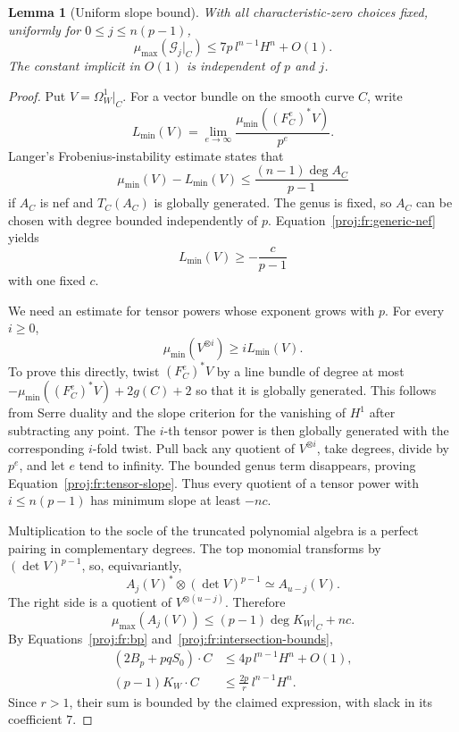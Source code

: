 \documentclass[11pt,letterpaper]{article}
\newtheorem{lemma}[theorem]{Lemma}
\theoremstyle{definition}
\theoremstyle{remark}
\begin{document}
\begin{lemma}[Uniform slope bound]
\label{proj:fr:slope}
With all characteristic-zero choices fixed, uniformly for
\(0\leq j\leq n(p-1)\),
\[
 \mu_{\max}(\mathcal G_j|_C)
     \leq 7p\,l^{n-1}H^n+O(1).
\]
The constant implicit in \(O(1)\) is independent of \(p\) and \(j\).
\end{lemma}

\begin{proof}
Put \(V=\Omega_W^1|_C\). For a vector bundle on the smooth curve \(C\),
write
\[
 L_{\min}(V)=
 \lim_{e\to\infty}
 \frac{\mu_{\min}((F_C^e)^*V)}{p^e}.
\]
Langer's Frobenius-instability estimate
\cite[Corollary~2.5]{Proj-Langer2004} states that
\[
 \mu_{\min}(V)-L_{\min}(V)
       \leq \frac{(n-1)\deg A_C}{p-1}
\]
if \(A_C\) is nef and \(T_C(A_C)\) is globally generated.
The genus is fixed, so \(A_C\) can be chosen with degree bounded
independently of \(p\). Equation~\eqref{proj:fr:generic-nef} yields
\begin{equation}
\label{proj:fr:asymptotic-slope}
 L_{\min}(V)\geq-\frac{c}{p-1}
\end{equation}
with one fixed \(c\).

We need an estimate for tensor powers whose exponent grows with \(p\).
For every \(i\geq0\),
\begin{equation}
\label{proj:fr:tensor-slope}
 \mu_{\min}(V^{\otimes i})\geq iL_{\min}(V).
\end{equation}
To prove this directly, twist \((F_C^e)^*V\) by a line bundle of
degree at most
\(-\mu_{\min}((F_C^e)^*V)+2g(C)+2\) so that it is globally generated.
This follows from Serre duality and the slope criterion for the
vanishing of \(H^1\) after subtracting any point. The \(i\)-th tensor
power is then globally generated with the corresponding \(i\)-fold
twist. Pull back any quotient of \(V^{\otimes i}\), take degrees,
divide by \(p^e\), and let \(e\) tend to infinity. The bounded genus
term disappears, proving Equation~\eqref{proj:fr:tensor-slope}.
Thus every quotient of a tensor power with \(i\leq n(p-1)\) has
minimum slope at least \(-nc\).

Multiplication to the socle of the truncated polynomial algebra is
a perfect pairing in complementary degrees. The top monomial
transforms by \((\det V)^{p-1}\), so, equivariantly,
\[
 A_j(V)^*\otimes(\det V)^{p-1}\simeq A_{u-j}(V).
\]
The right side is a quotient of \(V^{\otimes(u-j)}\). Therefore
\[
 \mu_{\max}(A_j(V))\leq(p-1)\deg K_W|_C+nc.
\]
By Equations~\eqref{proj:fr:bp} and~\eqref{proj:fr:intersection-bounds},
\begin{align*}
 (2B_p+pqS_0)\cdot C
   &\leq4p\,l^{n-1}H^n+O(1),\\
 (p-1)K_W\cdot C
   &\leq\frac{2p}{r}\,l^{n-1}H^n.
\end{align*}
Since \(r>1\), their sum is bounded by the claimed expression,
with slack in its coefficient \(7\).
\end{proof}
\end{document}
